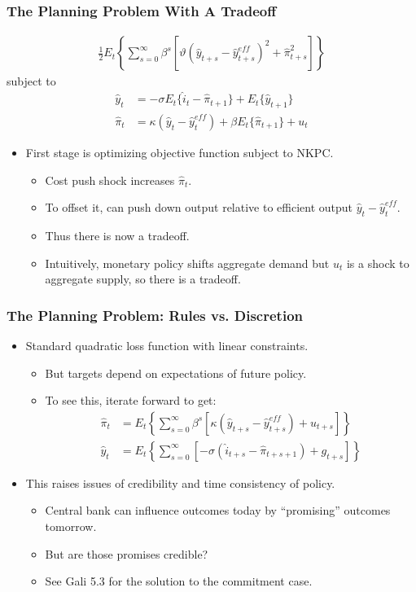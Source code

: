\documentclass[11pt,aspectratio=169,xcolor={dvipsnames},hyperref={pdftex,pdfpagemode=UseNone,hidelinks,pdfdisplaydoctitle=true},usepdftitle=false]{beamer}
\begin{document}
\begin{frame}
\frametitle{The Planning Problem With A Tradeoff}
\begin{align*}
		\frac{1}{2}E_t\left\{\sum_{s=0}^{\infty}\beta^s\left[\vartheta (\hat{y}_{t+s}-\hat{y}_{t+s}^{eff})^2+\hat{\pi}_{t+s}^2\right]\right\}
	\end{align*}
	subject to
	\begin{align*}
		\hat{y}_t &=-\sigma E_t\{\hat{i}_t-\hat{\pi}_{t+1}\}+E_t\{\hat{y}_{t+1}\} \\
		\hat{\pi}_t&=\kappa(\hat{y}_{t} - \hat{y}_{t}^{eff}) +\beta E_t \{\hat{\pi}_{t+1}\} + u_t 
	\end{align*}	
\begin{itemize}
	\item First stage is optimizing objective function subject to NKPC.
	\begin{itemize}
		\item Cost push shock increases $\hat{\pi}_t$.
		\item To offset it, can push down output relative to efficient output $\hat{y}_{t} - \hat{y}_{t}^{eff}$.
		\item Thus there is now a tradeoff.
		\item Intuitively, monetary policy shifts aggregate demand but $u_t$ is a
shock to aggregate supply, so there is a tradeoff.
	\end{itemize}
\end{itemize}
\end{frame}


\begin{frame}
\frametitle{The Planning Problem: Rules vs. Discretion}
\begin{itemize}
	\item Standard quadratic loss function with linear constraints.
	\begin{itemize}
		\item But targets depend on expectations of future policy.
		\item To see this, iterate forward to get:
		\begin{align*}
			\hat{\pi}_t &=E_t\left\{\sum_{s=0}^{\infty}\beta^s[\kappa (\hat{y}_{t+s} - \hat{y}_{t+s}^{eff})+u_{t+s}]\right\} \\
			\hat{y}_t &=E_t\left\{\sum_{s=0}^{\infty}\left[-\sigma (\hat{i}_{t+s}-\hat{\pi}_{t+s+1})+g_{t+s}\right]\right\} 
		\end{align*}
	\end{itemize}
 	\item This raises issues of credibility and time consistency of policy.
 	\begin{itemize}
 		\item Central bank can influence outcomes today by ``promising'' outcomes tomorrow.
 		\item But are those promises credible? 
 		\item See Gali 5.3 for the solution to the commitment case.
 	\end{itemize}
 	\end{itemize}
\end{frame}
\end{document}
